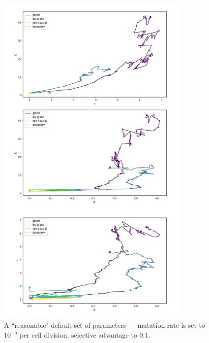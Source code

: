 \begin{figure}[h!]
    \centering
    \includegraphics[width=0.85\textwidth]{Chapter_3/figures/1e0501.pdf}
    \caption{A ``reasonable" default set of parameters --- mutation rate is set
    to $10^{-5}$ per cell division, selective advantage to $0.1$.}
    \label{fig:1e05_01}
\end{figure}

